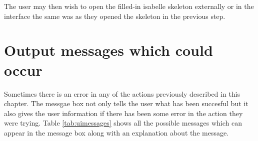 The user may then wish to open the filled-in isabelle skeleton externally or in the interface the same was as they opened the skeleton in the previous step.

\section{Output messages which could occur}

Sometimes there is an error in any of the actions previously described in this chapter. The messgae box not only tells the user what has been succesful but it also gives the user information if there has been some error in the action they were trying. Table \ref{tab:uimessages} shows all the possible messages which can appear in the message box along with an explanation about the message.

